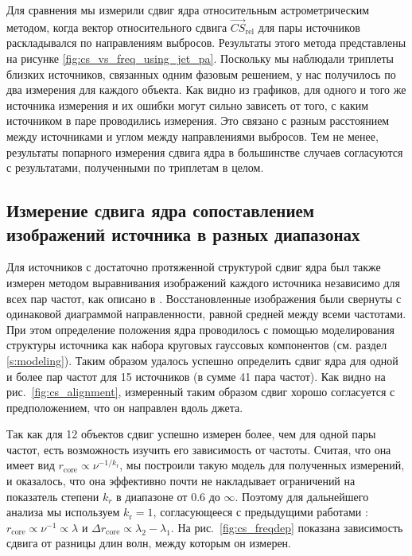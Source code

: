Для сравнения мы измерили сдвиг ядра относительным астрометрическим методом, когда вектор
относительного сдвига $\vec{CS}_{\mathrm{rel}}$ для пары источников раскладывался по направлениям
выбросов. Результаты этого
метода представлены на рисунке \ref{fig:cs_vs_freq_using_jet_pa}. Поскольку мы наблюдали триплеты
близких источников, связанных одним фазовым решением, у нас получилось по два измерения для каждого
объекта. Как видно из графиков, для одного и того же источника измерения и их ошибки могут сильно
зависеть от того, с каким источником в паре проводились измерения. Это связано с разным расстоянием
между источниками и углом между направлениями выбросов. Тем не менее, результаты попарного
измерения сдвига ядра в большинстве случаев согласуются с результатами, полученными по триплетам в
целом.

\subsection{Измерение сдвига ядра сопоставлением изображений источника в разных диапазонах}
\label{s:method_image}
Для источников с достаточно протяженной структурой сдвиг ядра был также измерен методом
выравнивания изображений каждого источника независимо для всех пар частот, как описано в
\cite{Plavin2018}. Восстановленные изображения были свернуты с одинаковой диаграммой направленности,
равной средней между всеми частотами. При этом определение положения ядра проводилось с помощью
моделирования структуры источника как набора круговых гауссовых компонентов (см. раздел
\ref{s:modeling}). Таким образом удалось успешно определить сдвиг ядра для одной и более пар частот
для 15 источников (в сумме 41 пара частот). Как видно на рис.~\ref{fig:cs_alignment}, измеренный
таким образом сдвиг хорошо согласуется с предположением, что он направлен вдоль джета.

Так как для 12 объектов сдвиг успешно измерен более, чем для одной пары частот, есть возможность
изучить его зависимость от частоты. Считая, что она имеет вид $r_\text{core} \propto
\nu^{-1/k_\text{r}}$, мы построили такую модель для полученных измерений, и оказалось, что она
эффективно почти не накладывает ограничений на показатель степени $k_r$ в диапазоне от $0.6$ до
$\infty$. Поэтому для дальнейшего анализа мы используем $k_\text{r} = 1$, согласующееся с
предыдущими работами \cite{Sokolovsky_2011}: $r_\text{core} \propto \nu^{-1} \propto \lambda$ и
$\Delta r_\text{core} \propto \lambda_2 - \lambda_1$. На рис.~\ref{fig:cs_freqdep} показана
зависимость сдвига от разницы длин волн, между которым он измерен.

